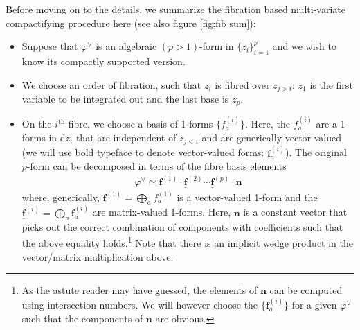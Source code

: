\documentclass[11pt]{article}
\renewcommand{\d}{\text{d}}
\newcommand{\be}{\begin{equation}}
\newcommand{\ee}{\end{equation}}
\newcommand{\vphi}{\varphi}
\newcommand{\bs}[1]{\boldsymbol{#1}}
\begin{document}
Before moving on to the details, we summarize the fibration based multi-variate compactifying procedure here (see also figure \ref{fig:fib sum}):
\begin{itemize}
\item
Suppose that $\vphi^\vee$ is an algebraic $(p{>}1)$-form in $\{z_i\}_{i=1}^p$ and we wish to know its compactly supported version.

\item 
We choose an order of fibration, such that $z_i$ is fibred over $z_{j>i}$: $z_1$ is the first variable to be integrated out and the last base is $z_p$.

\item 
On the $i^\text{th}$ fibre, we choose a basis of 1-forms $\{f^{(i)}_a\}$. Here, the $f^{(i)}_a$ are a 1-forms in $\d z_i$ that are independent of $z_{j<i}$ and are generically vector valued (we will use bold typeface to denote vector-valued forms: $\bs{f}^{(i)}_a$).
The original $p$-form can be decomposed in terms of the fibre basis elements 
\begin{align}
	\vphi^\vee 
	\simeq \bs{f}^{(1)} \cdot \underline{\bs{f}}^{(2)} \cdots \underline{\bs{f}}^{(p)} \cdot \bs{n} 
\end{align}
where, generically, $\bs{f}^{(1)} = \bigoplus_a f^{(1)}_a$ is a vector-valued 1-form and the $\underline{\bs{f}}^{(i)} = \bigoplus_a \bs{f}^{(i)}_a$ are matrix-valued 1-forms. Here, $\bs{n}$ is a constant vector that picks out the correct combination of components with coefficients such that the above equality holds.\footnote{As the astute reader may have guessed, the elements of $\bs{n}$ can be computed using intersection numbers. We will however choose the $\{\bs{f}^{(i)}_a\}$ for a given $\vphi^\vee$ such that the components of $\bs{n}$ are obvious.} 
Note that there is an implicit wedge product in the vector/matrix multiplication above. 


\end{itemize}
\end{document}
